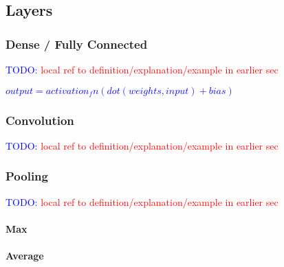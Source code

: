 \subsection{Layers}

\subsubsection{Dense / Fully Connected}

\textcolor{blue}{TODO: \textcolor{red}{local ref to definition/explanation/example in earlier sec}}

\textcolor{blue}{$output = activation_fn(dot(weights, input) + bias)$}

\subsubsection{Convolution}

\textcolor{blue}{TODO: \textcolor{red}{local ref to definition/explanation/example in earlier sec}}

\subsubsection{Pooling}

\textcolor{blue}{TODO: \textcolor{red}{local ref to definition/explanation/example in earlier sec}}

\paragraph{Max}

\paragraph{Average}